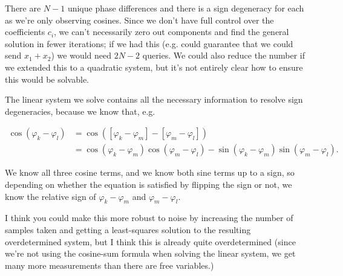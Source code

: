 \documentclass{article}
\begin{document}
    There are $N-1$ unique phase differences and there is a sign degeneracy for each as we're only observing cosines. Since we don't have full control over the coefficients $c_i$, we can't necessarily zero out components and find the general solution in fewer iterations; if we had this (e.g. could guarantee that we could send $x_1 + x_2$) we would need $2N-2$ queries. We could also reduce the number if we extended this to a quadratic system, but it's not entirely clear how to ensure this would be solvable.

    The linear system we solve contains all the necessary information to resolve sign degeneracies, because we know that, e.g.

    \begin{align*}
        \cos(\varphi_k - \varphi_l) &= \cos([\varphi_k - \varphi_m] - [\varphi_m - \varphi_l])\\
        &= \cos(\varphi_k - \varphi_m) \cos(\varphi_m - \varphi_l) - \sin(\varphi_k - \varphi_m) \sin(\varphi_m - \varphi_l).
    \end{align*}

    We know all three cosine terms, and we know both sine terms up to a sign, so depending on whether the equation is satisfied by flipping the sign or not, we know the relative sign of $\varphi_k - \varphi_m$ and $\varphi_m - \varphi_l$.

    I think you could make this more robust to noise by increasing the number of samples taken and getting a least-squares solution to the resulting overdetermined system, but I think this is already quite overdetermined (since we're not using the cosine-sum formula when solving the linear system, we get many more measurements than there are free variables.)
\end{document}
